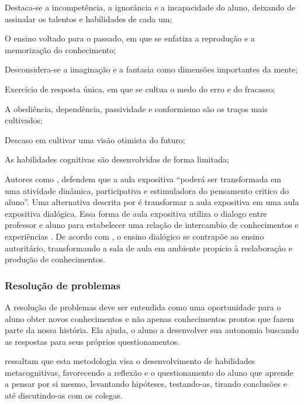 \begin{alineascomponto}
\item Destaca-se a incompetência, a ignorância e a incapacidade do aluno, deixando de assinalar os talentos e habilidades de cada um; 
\item O ensino voltado para o passado, em que se enfatiza a reprodução e a memorização do conhecimento;
\item Desconsidera-se a imaginação e a fantasia como dimensões importantes da mente;
\item Exercício de resposta única, em que se cultua o medo do erro e do fracasso;
\item A obediência, dependência, passividade e conformismo são os traços mais cultivados;
\item Descaso em cultivar uma visão otimista do futuro;
\item As habilidades cognitivas são desenvolvidas de forma limitada;
\end{alineascomponto}

Autores como , defendem que a aula expositiva ``poderá ser transformada em uma atividade dinâmica, participativa e estimuladora do pensamento critico do aluno''. Uma alternativa descrita por  é transformar a aula expositiva em uma aula expositiva dialógica. Essa forma de aula expositiva utiliza o dialogo entre professor e aluno para estabelecer uma relação de intercambio de conhecimentos e experiências \cite{lopes1995aula}. De acordo com , o ensino dialógico se contrapõe ao ensino 
autoritário,  transformando  a  sala  de  aula  em  ambiente  propicio  à  reelaboração  e produção de conhecimentos.


\subsubsection{Resolução de problemas}\label{resolucao_problemas}

A resolução de problemas deve ser entendida como uma oportunidade para o aluno obter novos conhecimentos e não apenas conhecimentos prontos que fazem parte da nossa história. Ela ajuda, o aluno a desenvolver sua autonomia buscando as respostas para seus próprios questionamentos.

 ressaltam  que esta metodologia visa o desenvolvimento de habilidades metacognitivas, favorecendo a reflexão e o questionamento do aluno que aprende a pensar por si mesmo, levantando hipóteses, testando-as, tirando conclusões e até discutindo-as com os colegas.

